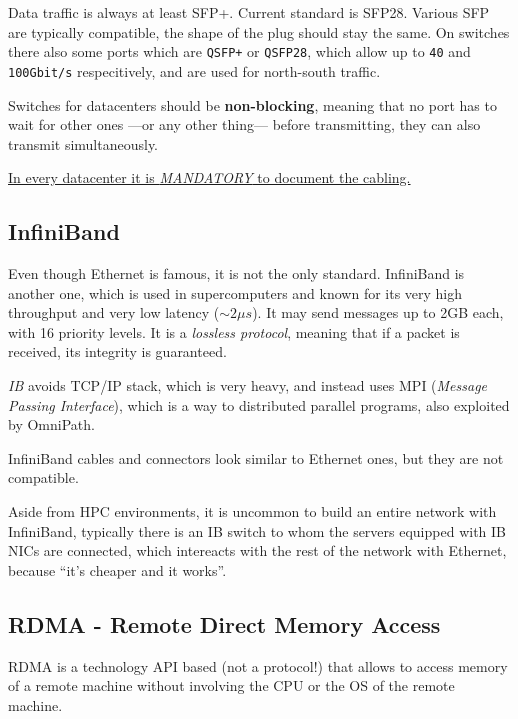 
Data traffic is always at least SFP+.
Current standard is SFP28. Various SFP are typically compatible, the shape of the plug should stay the same.
On switches there also some ports which are \texttt{QSFP+} or \texttt{QSFP28}, which allow up to \texttt{40} and \texttt{100Gbit/s} respecitively, and are used for north-south traffic.

Switches for datacenters should be \textbf{non-blocking}, meaning that no port has to wait for other ones ---or any other thing--- before transmitting, they can also transmit simultaneously.


\ul{In every datacenter it is \textit{MANDATORY} to document the cabling.}

\subsection{InfiniBand}
Even though Ethernet is famous, it is not the only standard. InfiniBand is another one, which is used in supercomputers and known for its very high throughput and very low latency ($\sim 2\mu s$).
It may send messages up to 2GB each, with 16 priority levels.
It is a \textit{lossless protocol}, meaning that if a packet is received, its integrity is guaranteed.

\textit{IB} avoids TCP/IP stack, which is very heavy, and instead uses MPI (\textit{Message Passing Interface}), which is a way to distributed parallel programs, also exploited by OmniPath.

InfiniBand cables and connectors look similar to Ethernet ones, but they are not compatible.

Aside from HPC environments, it is uncommon to build an entire network with InfiniBand, typically there is an IB switch to whom the servers equipped with IB NICs are connected, which intereacts with the rest of the network with Ethernet, because ``it's cheaper and it works''.

\subsection{RDMA - Remote Direct Memory Access}

RDMA is a technology API based (not a protocol!) that allows to access memory of a remote machine without involving the CPU or the OS of the remote machine.

